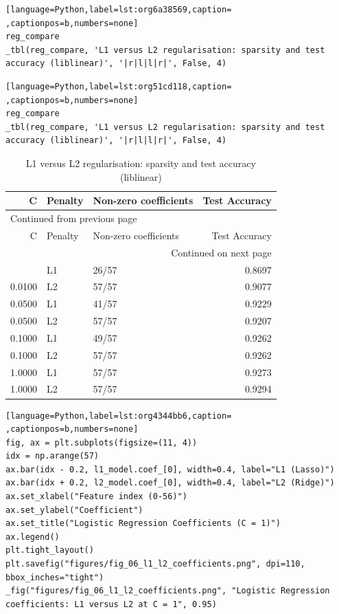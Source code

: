 \documentclass[11pt]{article}
\begin{document}
\begin{lstlisting}[language=Python,label=lst:org6a38569,caption= ,captionpos=b,numbers=none]
reg_compare
_tbl(reg_compare, 'L1 versus L2 regularisation: sparsity and test accuracy (liblinear)', '|r|l|l|r|', False, 4)
\end{lstlisting}
\begin{lstlisting}[language=Python,label=lst:org51cd118,caption= ,captionpos=b,numbers=none]
reg_compare
_tbl(reg_compare, 'L1 versus L2 regularisation: sparsity and test accuracy (liblinear)', '|r|l|l|r|', False, 4)
\end{lstlisting}

\begin{longtable}{|r|l|l|r|}
\caption{L1 versus L2 regularisation: sparsity and test accuracy (liblinear)}
\\[0pt]
\hline
C & Penalty & Non-zero coefficients & Test Accuracy\\[0pt]
\hline
\endfirsthead
\multicolumn{4}{l}{Continued from previous page} \\[0pt]
\hline

C & Penalty & Non-zero coefficients & Test Accuracy \\[0pt]

\hline
\endhead
\hline\multicolumn{4}{r}{Continued on next page} \\
\endfoot
\endlastfoot
\hline
0.0100 & L1 & 26/57 & 0.8697\\[0pt]
\hline
0.0100 & L2 & 57/57 & 0.9077\\[0pt]
\hline
0.0500 & L1 & 41/57 & 0.9229\\[0pt]
\hline
0.0500 & L2 & 57/57 & 0.9207\\[0pt]
\hline
0.1000 & L1 & 49/57 & 0.9262\\[0pt]
\hline
0.1000 & L2 & 57/57 & 0.9262\\[0pt]
\hline
1.0000 & L1 & 57/57 & 0.9273\\[0pt]
\hline
1.0000 & L2 & 57/57 & 0.9294\\[0pt]
\hline
\end{longtable}
\begin{lstlisting}[language=Python,label=lst:org4344bb6,caption= ,captionpos=b,numbers=none]
fig, ax = plt.subplots(figsize=(11, 4))
idx = np.arange(57)
ax.bar(idx - 0.2, l1_model.coef_[0], width=0.4, label="L1 (Lasso)")
ax.bar(idx + 0.2, l2_model.coef_[0], width=0.4, label="L2 (Ridge)")
ax.set_xlabel("Feature index (0-56)")
ax.set_ylabel("Coefficient")
ax.set_title("Logistic Regression Coefficients (C = 1)")
ax.legend()
plt.tight_layout()
plt.savefig("figures/fig_06_l1_l2_coefficients.png", dpi=110, bbox_inches="tight")
_fig("figures/fig_06_l1_l2_coefficients.png", "Logistic Regression coefficients: L1 versus L2 at C = 1", 0.95)
\end{lstlisting}
\end{document}

